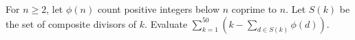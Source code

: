 For $n\ge2$, let $\phi(n)$ count positive integers below $n$ coprime to $n$. Let $S(k)$ be the set of composite divisors of $k$. Evaluate $\displaystyle\sum_{k=1}^{50}\left(k-\sum_{d\in S(k)}\phi(d)\right)$.
